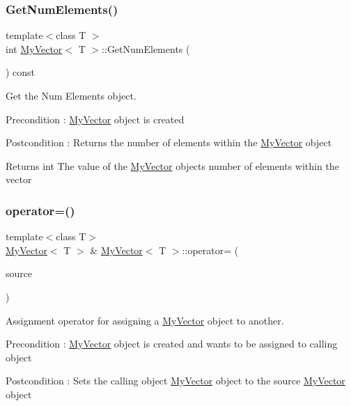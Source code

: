 \subsubsection{\texorpdfstring{GetNumElements()}{GetNumElements()}}
{\footnotesize\ttfamily template$<$class T $>$ \\
int \mbox{\hyperlink{class_my_vector}{My\+Vector}}$<$ T $>$\+::Get\+Num\+Elements (\begin{DoxyParamCaption}{ }\end{DoxyParamCaption}) const}



Get the Num Elements object. 

\begin{DoxyPrecond}{Precondition}
\+: \mbox{\hyperlink{class_my_vector}{My\+Vector}} object is created 
\end{DoxyPrecond}
\begin{DoxyPostcond}{Postcondition}
\+: Returns the number of elements within the \mbox{\hyperlink{class_my_vector}{My\+Vector}} object 
\end{DoxyPostcond}
\begin{DoxyReturn}{Returns}
int The value of the \mbox{\hyperlink{class_my_vector}{My\+Vector}} object\textquotesingle{}s number of elements within the vector 
\end{DoxyReturn}
\mbox{\label{class_my_vector_a459ecae4c3fc3836415467db79bd0af2}} 
\subsubsection{\texorpdfstring{operator=()}{operator=()}}
{\footnotesize\ttfamily template$<$class T$>$ \\
\mbox{\hyperlink{class_my_vector}{My\+Vector}}$<$ T $>$ \& \mbox{\hyperlink{class_my_vector}{My\+Vector}}$<$ T $>$\+::operator= (\begin{DoxyParamCaption}\item[{const \mbox{\hyperlink{class_my_vector}{My\+Vector}}$<$ T $>$ \&}]{source }\end{DoxyParamCaption})}



Assignment operator for assigning a \mbox{\hyperlink{class_my_vector}{My\+Vector}} object to another. 

\begin{DoxyPrecond}{Precondition}
\+: \mbox{\hyperlink{class_my_vector}{My\+Vector}} object is created and want\textquotesingle{}s to be assigned to calling object 
\end{DoxyPrecond}
\begin{DoxyPostcond}{Postcondition}
\+: Sets the calling object \mbox{\hyperlink{class_my_vector}{My\+Vector}} object to the source \mbox{\hyperlink{class_my_vector}{My\+Vector}} object 
\end{DoxyPostcond}

